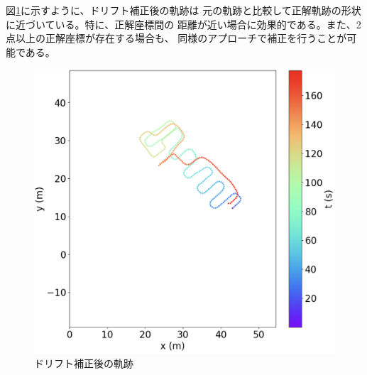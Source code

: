 図\ref{fig:pdr-remove-drift}に示すように、ドリフト補正後の軌跡は
元の軌跡と比較して正解軌跡の形状に近づいている。特に、正解座標間の
距離が近い場合に効果的である。また、2点以上の正解座標が存在する場合も、
同様のアプローチで補正を行うことが可能である。

\begin{figure}[H]
	\centering
	\includegraphics[width=\linewidth]{image/pdr-remove-drift-two.jpg}
	\caption{ドリフト補正後の軌跡}    \label{fig:pdr-remove-drift}
\end{figure}

